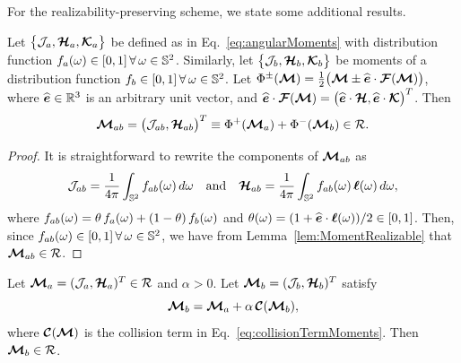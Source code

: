 For the realizability-preserving scheme, we state some additional results.  
\begin{lemma}
  Let $\big\{\mathcal{J}_{a},\boldsymbol{\mathcal{H}}_{a},\boldsymbol{\mathcal{K}}_{a}\big\}$ be defined as in Eq.~\eqref{eq:angularMoments} with distribution function $f_{a}(\omega)\in[0,1]\,\forall\,\omega\in\mathbb{S}^{2}$.  
  Similarly, let $\big\{\mathcal{J}_{b},\boldsymbol{\mathcal{H}}_{b},\boldsymbol{\mathcal{K}}_{b}\big\}$ be moments of a distribution function $f_{b}\in[0,1]\,\forall\,\omega\in\mathbb{S}^{2}$.  
  Let $\Phi^{\pm}(\boldsymbol{\mathcal{M}})=\frac{1}{2}\big(\boldsymbol{\mathcal{M}}\pm\widehat{\boldsymbol{e}}\cdot\boldsymbol{\mathcal{F}}(\boldsymbol{\mathcal{M}})\big)$, where $\widehat{\boldsymbol{e}}\in\mathbb{R}^{3}$ is an arbitrary unit vector, and $\widehat{\boldsymbol{e}}\cdot\boldsymbol{\mathcal{F}}(\boldsymbol{\mathcal{M}})=\big(\widehat{\boldsymbol{e}}\cdot\boldsymbol{\mathcal{H}},\widehat{\boldsymbol{e}}\cdot\boldsymbol{\mathcal{K}}\big)^{T}$.  
  Then
  \begin{equation*}
    \boldsymbol{\mathcal{M}}_{ab} = \big(\mathcal{J}_{ab},\boldsymbol{\mathcal{H}}_{ab}\big)^{T} \equiv \Phi^{+}(\boldsymbol{\mathcal{M}}_{a})+\Phi^{-}(\boldsymbol{\mathcal{M}}_{b})\in\mathcal{R}.
  \end{equation*}
\end{lemma}
\begin{proof}
  It is straightforward to rewrite the components of $\boldsymbol{\mathcal{M}}_{ab}$ as
  \begin{equation*}
    \mathcal{J}_{ab}=\frac{1}{4\pi}\int_{\mathbb{S}^{2}}f_{ab}(\omega)\,d\omega
    \quad\text{and}\quad
    \boldsymbol{\mathcal{H}}_{ab}=\frac{1}{4\pi}\int_{\mathbb{S}^{2}}f_{ab}(\omega)\,\boldsymbol{\ell}(\omega)\,d\omega,
  \end{equation*}
  where $f_{ab}(\omega)=\theta\,f_{a}(\omega)+(1-\theta)\,f_{b}(\omega)$ and $\theta(\omega)=(1+\widehat{\boldsymbol{e}}\cdot\boldsymbol{\ell}(\omega))/2\in[0,1]$.  
  Then, since $f_{ab}(\omega)\in[0,1]\,\forall\,\omega\in\mathbb{S}^{2}$, we have from Lemma~\ref{lem:MomentRealizable} that $\boldsymbol{\mathcal{M}}_{ab}\in\mathcal{R}$.  
\end{proof}

\begin{lemma}
  Let $\boldsymbol{\mathcal{M}}_{a}=(\mathcal{J}_{a},\boldsymbol{\mathcal{H}}_{a})^{T}\in\mathcal{R}$ and $\alpha>0$.  
  Let $\boldsymbol{\mathcal{M}}_{b}=(\mathcal{J}_{b},\boldsymbol{\mathcal{H}}_{b})^{T}$ satisfy
  \begin{equation*}
    \boldsymbol{\mathcal{M}}_{b}=\boldsymbol{\mathcal{M}}_{a}+\alpha\,\boldsymbol{\mathcal{C}}(\boldsymbol{\mathcal{M}}_{b}), 
  \end{equation*}
  where $\boldsymbol{\mathcal{C}}(\boldsymbol{\mathcal{M}})$ is the collision term in Eq.~\eqref{eq:collisionTermMoments}.  
  Then $\boldsymbol{\mathcal{M}}_{b}\in\mathcal{R}$.  
  \label{lem:implicitStep}
\end{lemma}


